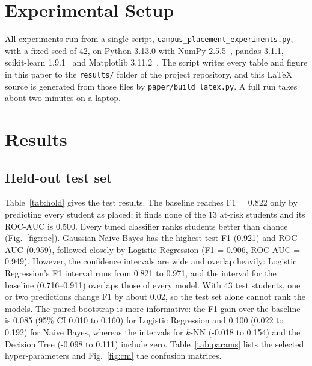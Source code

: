 \documentclass[runningheads]{llncs}
\begin{document}
\section{Experimental Setup}\label{sec:setup}
All experiments run from a single script, \texttt{campus\_placement\_experiments.py}, with a fixed seed of 42, on Python 3.13.0 with NumPy 2.5.5~\cite{numpy}, pandas 3.1.1, scikit-learn 1.9.1~\cite{sklearn} and Matplotlib 3.11.2~\cite{matplotlib}. The script writes every table and figure in this paper to the \texttt{results/} folder of the project repository, and this \LaTeX{} source is generated from those files by \texttt{paper/build\_latex.py}. A full run takes about two minutes on a laptop.

\section{Results}\label{sec:results}
\subsection{Held-out test set}
Table~\ref{tab:hold} gives the test results. The baseline reaches F1 = 0.822 only by predicting every student as placed; it finds none of the 13 at-risk students and its ROC-AUC is 0.500. Every tuned classifier ranks students better than chance (Fig.~\ref{fig:roc}). Gaussian Naive Bayes has the highest test F1 (0.921) and ROC-AUC (0.959), followed closely by Logistic Regression (F1 = 0.906, ROC-AUC = 0.949). However, the confidence intervals are wide and overlap heavily: Logistic Regression's F1 interval runs from 0.821 to 0.971, and the interval for the baseline (0.716--0.911) overlaps those of every model. With 43 test students, one or two predictions change F1 by about 0.02, so the test set alone cannot rank the models. The paired bootstrap is more informative: the F1 gain over the baseline is 0.085 (95\% CI 0.010 to 0.160) for Logistic Regression and 0.100 (0.022 to 0.192) for Naive Bayes, whereas the intervals for $k$-NN (-0.018 to 0.154) and the Decision Tree (-0.098 to 0.111) include zero. Table~\ref{tab:params} lists the selected hyper-parameters and Fig.~\ref{fig:cm} the confusion matrices.
\end{document}
